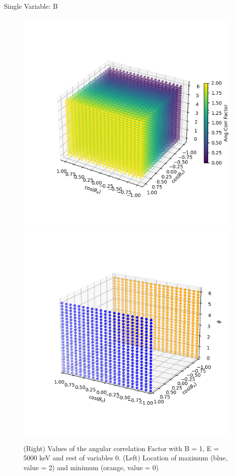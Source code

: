 \documentclass{beamer}
\begin{document}
\begin{frame}{Single Variable: B}
\begin{figure}
	\centering
	\includegraphics[width=0.4\paperwidth]{plots/B_3D_image.png}
	\includegraphics[width=0.4\paperwidth]{plots/B_max_min.png}
	\caption{(Right) Values of the angular correlation Factor with B = 1, E = 5000 keV and rest of variables 0. (Left) Location of maximum (blue, value = 2) and minimum (orange, value = 0)}
\end{figure}
\end{frame}
\end{document}
